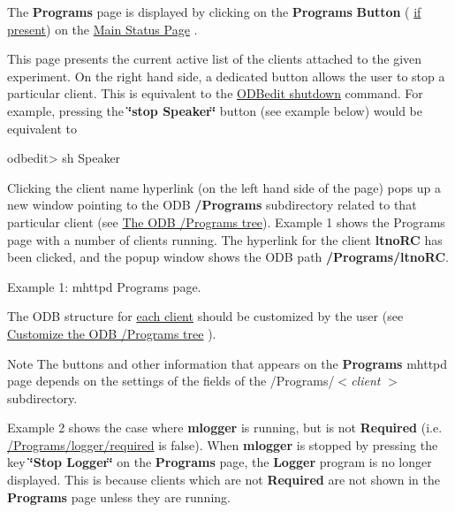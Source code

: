 \par
 The {\bfseries Programs} page is displayed by clicking on the {\bfseries Programs} {\bfseries Button} ( \hyperlink{RC_mhttpd_status_page_features_RC_mhttpd_status_menu_buttons}{if present}) on the \hyperlink{RC_mhttpd_Main_Status_page}{Main Status Page} .

This page presents the current active list of the clients attached to the given experiment. On the right hand side, a dedicated button allows the user to stop a particular client. This is equivalent to the \hyperlink{RC_odbedit_examples_RC_odbedit_sh}{ODBedit shutdown} command. For example, pressing the {\bfseries \char`\"{}stop Speaker\char`\"{}} button (see example below) would be equivalent to 
\begin{DoxyCode}
odbedit> sh Speaker
\end{DoxyCode}


Clicking the client name hyperlink (on the left hand side of the page) pops up a new window pointing to the ODB {\bfseries /Programs} subdirectory related to that particular client (see \hyperlink{RC_customize_ODB_RC_ODB_Programs_Tree}{The ODB /Programs tree}). Example 1 shows the Programs page with a number of clients running. The hyperlink for the client {\bfseries ltnoRC} has been clicked, and the popup window shows the ODB path {\bfseries /Programs/ltnoRC}.

\par
\par
\par
 \begin{center}  Example 1: mhttpd Programs page. \par
\par
\par
   \end{center}  \par
\par
\par


The ODB structure for \hyperlink{RC_customize_ODB_RC_ODB_programs_client}{each client} should be customized by the user (see \hyperlink{RC_customize_ODB_RC_customize_Programs_tree}{Customize the ODB /Programs tree} ). \par
 \begin{DoxyNote}{Note}
The buttons and other information that appears on the {\bfseries Programs} mhttpd page depends on the settings of the fields of the /Programs/$<${\itshape client\/} $>$ subdirectory.
\end{DoxyNote}
\label{RC_mhttpd_Program_page_RC_mhttpd_Required}
\hypertarget{RC_mhttpd_Program_page_RC_mhttpd_Required}{}
 Example 2 shows the case where {\bfseries mlogger} is running, but is not {\bfseries Required} (i.e. \hyperlink{RC_customize_ODB_RC_programs_Required}{/Programs/logger/required} is false). When {\bfseries mlogger} is stopped by pressing the key {\bfseries \char`\"{}Stop Logger\char`\"{}} on the {\bfseries Programs} page, the {\bfseries Logger} program is no longer displayed. This is because  clients which are not {\bfseries Required} are not shown in the {\bfseries Programs} page unless they are running.

